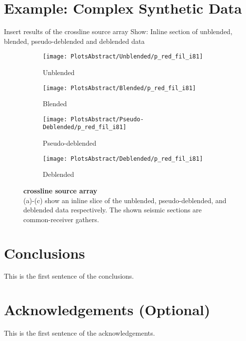 \documentclass{madrid15WS}
\begin{document}
\section{Example: Complex Synthetic Data}

Insert results of the crossline source array
Show: Inline section of unblended, blended, pseudo-deblended and deblended data

\begin{figure}
	\centering
	\begin{subfigure}[t]{0.2\textwidth}
		\centering
		\texttt{[image: PlotsAbstract/Unblended/p\_red\_fil\_i81]}
		\caption{Unblended}
		\label{fig:Example-Unblendedx}
	\end{subfigure}
	\centering
	\begin{subfigure}[t]{0.11286\textwidth}
		\centering
		\texttt{[image: PlotsAbstract/Blended/p\_red\_fil\_i81]}
		\caption{Blended}
		\label{fig:Example-Blendedx}
	\end{subfigure}
	\centering
	\begin{subfigure}[t]{0.2\textwidth}
		\centering
		\texttt{[image: PlotsAbstract/Pseudo-Deblended/p\_red\_fil\_i81]} %
		\caption{Pseudo-deblended}
		\label{fig:Example-Pseudox}
	\end{subfigure}
	\centering
	\begin{subfigure}[t]{0.2\textwidth}
		\centering
		\texttt{[image: PlotsAbstract/Deblended/p\_red\_fil\_i81]} %
		\caption{Deblended}
		\label{fig:Example-Deblendedx}
	\end{subfigure}
		
	\caption{\textbf{crossline source array}\\(a)-(c) show an inline slice of the unblended, pseudo-deblended, and deblended data respectively. The shown seismic sections are common-receiver gathers.}
	\label{fig:Example-Inline-Slices}

\end{figure}


\section{Conclusions}

This is the first sentence of the conclusions.

\section{Acknowledgements (Optional)}

This is the first sentence of the acknowledgements.

%
%
% 


\end{document}
